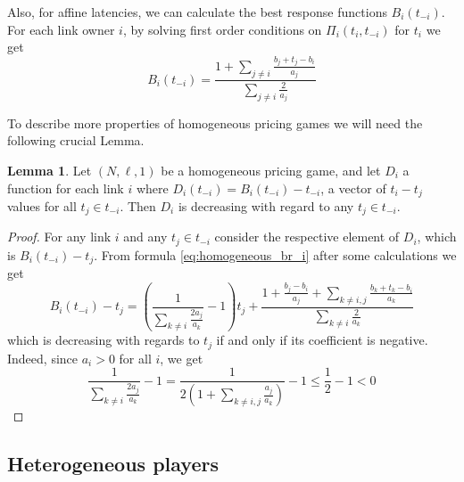 \documentclass[10pt,a4paper]{book}
\theoremstyle{definition}
\newtheorem{lemma}[definition]{Lemma}
\theoremstyle{comment}
\begin{document}
Also, for affine latencies, we can calculate the best response functions $B_i(t_{-i})$.
For each link owner $i$, by solving first order conditions on $\Pi_i(t_i, t_{-i})$ for $t_i$ we get
\begin{equation}
	\label{eq:homogeneous_br_i}
	B_i(t_{-i}) = \frac{1 + \sum_{j \ne i}\frac{b_j + t_j - b_i}{a_j}}{\sum_{j \ne i}\frac{2}{a_j}}
\end{equation}




To describe more properties of homogeneous pricing games we will need the following crucial Lemma.
\begin{lemma}
	\label{lemma:tolls_diff}
	Let $(N, \ell, 1)$ be a homogeneous pricing game, and let $D_i$ a function for each link $i$ where $D_i(t_{-i}) = B_i(t_{-i}) - t_{-i}$, a vector of $t_i - t_j$ values for all $t_j \in t_{-i}$.
	Then $D_i$ is decreasing with regard to any $t_j \in t_{-i}$.
\end{lemma}

\begin{proof}
	For any link $i$ and any $t_j \in t_{-i}$ consider the respective element of $D_i$, which is $B_i(t_{-i}) - t_j$.
	From formula \ref{eq:homogeneous_br_i} after some calculations we get
	\[
		B_i(t_{-i}) - t_j = \left(\frac{1}{\sum_{k \ne i} \frac{2a_j}{a_k}} - 1\right)t_j + \frac{1 + \frac{b_j - b_i}{a_j} + \sum_{k \ne i, j}\frac{b_k + t_k - b_i}{a_k}}{\sum_{k \ne i} \frac{2}{a_k}}
	\]
	which is decreasing with regards to $t_j$ if and only if its coefficient is negative.
	Indeed, since $a_i > 0$ for all $i$, we get
	\[
		\frac{1}{\sum_{k \ne i} \frac{2a_j}{a_k}} - 1 = \frac{1}{2 \left(1 + \sum_{k \ne i, j} \frac{a_j}{a_k}\right)} - 1 \leq \frac{1}{2} - 1 < 0
	\]
\end{proof}

\subsection*{Heterogeneous players}
\end{document}
